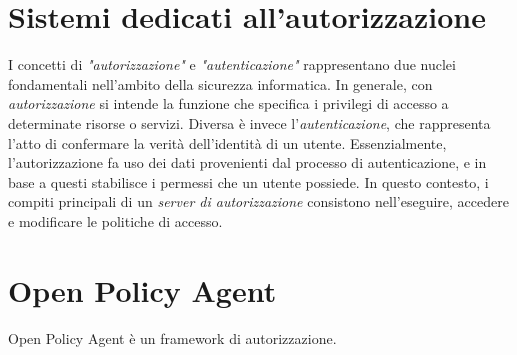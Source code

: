 \section{Sistemi dedicati all'autorizzazione}

I concetti di \textit{"autorizzazione"} e \textit{"autenticazione"} rappresentano due nuclei fondamentali nell'ambito 
della sicurezza informatica. In generale, con \textit{autorizzazione} si intende la funzione che specifica i privilegi di accesso a determinate risorse o servizi. 
Diversa è invece l'\textit{autenticazione}, che rappresenta l'atto di confermare la verità dell'identità di un utente.
Essenzialmente, l'autorizzazione fa uso dei dati provenienti dal processo di autenticazione, e in base a questi stabilisce i permessi che un utente possiede.
\linebreak
In questo contesto, i compiti principali di un \textit{server di autorizzazione} consistono nell'eseguire, accedere e modificare le politiche di accesso.

\section{Open Policy Agent}
Open Policy Agent è un framework di autorizzazione. 